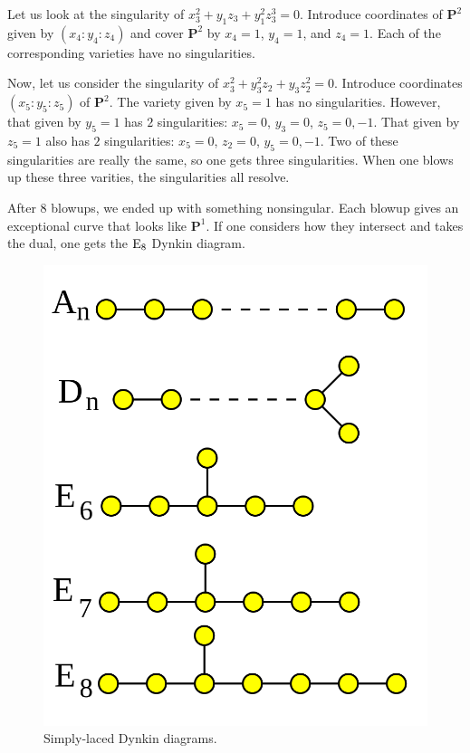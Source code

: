 \documentclass[11pt, oneside,margin=1in]{article}
\begin{document}
\begin{example}
Let us look at the singularity of $x_3^2+y_1z_3+y_1^2z_3^3 =0 $. Introduce coordinates of $\mathbf{P}^2$ given by $(x_4:y_4:z_4)$ and cover $\mathbf{P}^2$ by $x_4=1$, $y_4=1$, and $z_4=1$. Each of the corresponding varieties have no singularities.

Now, let us consider the singularity of $x_3^2+y_3^2z_2+y_3z_2^2 =0$. Introduce coordinates $(x_5:y_5:z_5)$ of $\mathbf{P}^2$. The variety given by $x_5=1$ has no singularities. However, that given by $y_5=1$ has $2$ singularities: $x_5=0$, $y_3=0$, $z_5=0,-1$. That given by $z_5=1$ also has $2$ singularities: $x_5=0$, $z_2=0$, $y_5=0,-1$. Two of these singularities are really the same, so one gets three singularities. 
When one blows up these three varities, the singularities all resolve.
\end{example} 

After $8$ blowups, we ended up with something nonsingular. Each blowup gives an exceptional curve that looks like $\mathbf{P}^1$. If one considers how they intersect and takes the dual, one gets the $\operatorname{E}_8$ Dynkin diagram. 

\begin{figure}
	\begin{center}
		\includegraphics[scale=0.3]{images/simply_laced}
		\caption{Simply-laced Dynkin diagrams.}
	\end{center}
\end{figure}
\end{document}
